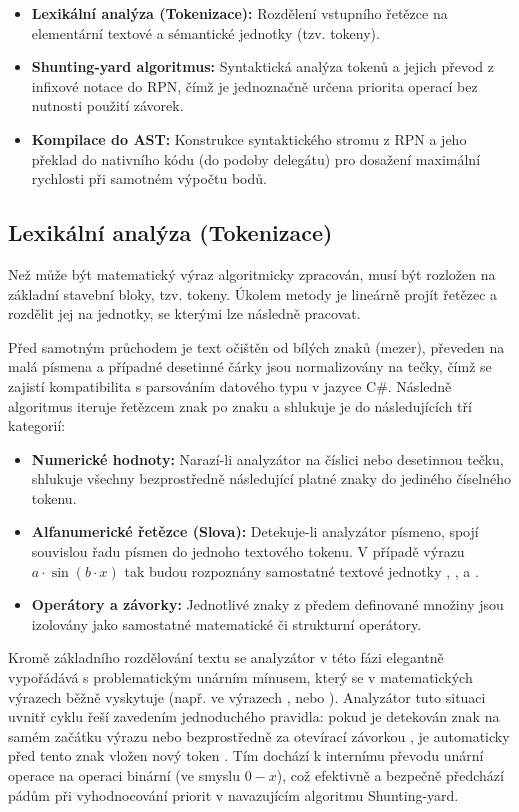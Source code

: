 \documentclass[czech, kiv, sem, he, iso690alph, pdf,viewonly]{fasthesis}
\begin{document}
\begin{itemize}
    \item \textbf{Lexikální analýza (Tokenizace):} Rozdělení vstupního řetězce na elementární textové a sémantické jednotky (tzv. tokeny).
    \item \textbf{Shunting-yard algoritmus:} Syntaktická analýza tokenů a jejich převod z infixové notace do RPN, čímž je jednoznačně určena priorita operací bez nutnosti použití závorek.
    \item \textbf{Kompilace do AST:} Konstrukce syntaktického stromu z RPN a jeho překlad do nativního kódu (do podoby delegátu) pro dosažení maximální rychlosti při samotném výpočtu bodů.
\end{itemize}

\subsection{Lexikální analýza (Tokenizace)}
Než může být matematický výraz algoritmicky zpracován, musí být rozložen na základní stavební bloky, tzv. tokeny. Úkolem metody  je lineárně projít řetězec a rozdělit jej na jednotky, 
se kterými lze následně pracovat.

Před samotným průchodem je text očištěn od bílých znaků (mezer), převeden na malá písmena a případné desetinné čárky jsou normalizovány na tečky, čímž se zajistí kompatibilita s 
parsováním datového typu  v jazyce C\#. Následně algoritmus iteruje řetězcem znak po znaku a shlukuje je do následujících tří kategorií:

\begin{itemize}
    \item \textbf{Numerické hodnoty:} Narazí-li analyzátor na číslici nebo desetinnou tečku, shlukuje všechny bezprostředně následující platné znaky do jediného číselného tokenu.
    \item \textbf{Alfanumerické řetězce (Slova):} Detekuje-li analyzátor písmeno, spojí souvislou řadu písmen do jednoho textového tokenu. V případě výrazu $a \cdot \sin(b \cdot x)$ 
    tak budou rozpoznány samostatné textové jednotky , ,  a .
    \item \textbf{Operátory a závorky:} Jednotlivé znaky z předem definované množiny \command{+-*/^()} jsou izolovány jako samostatné matematické či strukturní operátory.
\end{itemize}

Kromě základního rozdělování textu se analyzátor v této fázi elegantně vypořádává s problematickým unárním mínusem, který se v matematických výrazech běžně vyskytuje 
(např. ve výrazech ,  nebo ). Analyzátor tuto situaci uvnitř cyklu řeší zavedením jednoduchého pravidla: pokud je detekován znak \command{-} 
na samém začátku výrazu nebo bezprostředně za otevírací závorkou \command{()}, je automaticky před tento znak vložen nový token . 
Tím dochází k internímu převodu unární operace na operaci binární (ve smyslu $0 - x$), což efektivně a bezpečně předchází pádům při vyhodnocování priorit v navazujícím algoritmu Shunting-yard.
\end{document}
